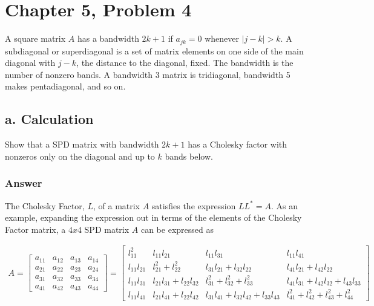\documentclass{article}
\begin{document}
	\section{Chapter 5, Problem 4}
	A square matrix $A$ has a bandwidth $2k+1$ if $a_{jk}=0$ whenever $|j-k|>k$.  A subdiagonal or superdiagonal is a set of matrix elements on one side of the main diagonal with $j-k$, the distance to the diagonal, fixed.  The bandwidth is the number of nonzero bands.  A bandwidth 3 matrix is tridiagonal, bandwidth 5 makes pentadiagonal, and so on.
	
		\subsection{a. Calculation}
		Show that a SPD matrix with bandwidth $2k+1$ has a Cholesky factor with nonzeros only on the diagonal and up to $k$ bands below.
		
		\subsubsection{Answer}
		The Cholesky Factor, $L$, of a matrix $A$ satisfies the expression $LL^{*}=A$.  As an example, expanding the expression out in terms of the elements of the Cholesky Factor matrix, a $4x4$ SPD matrix $A$ can be expressed as 
		
		\begin{align*}
			A=
			\begin{bmatrix}
			a_{11} & a_{12} & a_{13} & a_{14} \\
			a_{21} & a_{22} & a_{23} & a_{24}  \\
			a_{31} & a_{32} & a_{33} & a_{34} \\
			a_{41}  & a_{42} & a_{43} & a_{44}
			\end{bmatrix}=
			\begin{bmatrix}
			l_{11}^{2} & l_{11}l_{21} & l_{11}l_{31} & l_{11}l_{41} \\
			l_{11}l_{21} & l_{21}^{2}+l_{22}^{2} & l_{31}l_{21}+l_{32}l_{22} & l_{41}l_{21}+l_{42}l_{22}\\
			l_{11}l_{31} & l_{21}l_{31}+l_{22}l_{32} & l_{31}^{2}+l_{32}^{2}+l_{33}^{2} & l_{41}l_{31}+l_{42}l_{32}+l_{43}l_{33} \\
			l_{11}l_{41} & l_{21}l_{41}+l_{22}l_{42} & l_{31}l_{41}+l_{32}l_{42}+l_{33}l_{43} & l_{41}^{2}+l_{42}^{2}+l_{43}^{2}+l_{44}^{2}
			\end{bmatrix}
		\end{align*}
		
\end{document}
